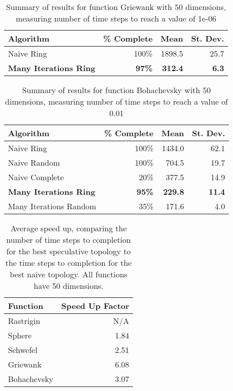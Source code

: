 \documentclass[smallcondensed]{svjour3}
\begin{document}
\begin{table}
  \caption{Summary of results for function Griewank with 50 dimensions,
  measuring number of time steps to reach a value of 1e-06}
  \label{tab:griewank-50}
  \centering
  \begin{tabular}{|l|r|r|r|}
  \hline
  Algorithm&\% Complete&Mean&St. Dev.\\
  \hline
  \hline
  Naive Ring&100\%&1898.5&25.7\\
  \hline
  \textbf{Many Iterations Ring}&\textbf{97\%}&\textbf{312.4}&\textbf{6.3}\\
  \hline
  \end{tabular}
\end{table}

\begin{table}
  \caption{Summary of results for function Bohachevsky with 50 dimensions,
  measuring number of time steps to reach a value of 0.01}
  \label{tab:bohachevsky-50}
  \centering
  \begin{tabular}{|l|r|r|r|}
  \hline
  Algorithm&\% Complete&Mean&St. Dev.\\
  \hline
  \hline
  Naive Ring&100\%&1434.0&62.1\\
  \hline
  Naive Random&100\%&704.5&19.7\\
  \hline
  Naive Complete&20\%&377.5&14.9\\
  \hline
  \textbf{Many Iterations Ring}&\textbf{95\%}&\textbf{229.8}&\textbf{11.4}\\
  \hline
  Many Iterations Random&35\%&171.6&4.0\\
  \hline
  \end{tabular}
\end{table}

\begin{table}
  \caption{Average speed up, comparing the number of time steps to completion
  for the best speculative topology to the time steps to completion for the
  best naive topology.  All functions have 50 dimensions.}
  \label{tab:50dims-summary}
  \centering
  \begin{tabular}{|l|r|}
	\hline
	Function&Speed Up Factor\\
	\hline
	Rastrigin&N/A\\
	\hline
	Sphere&1.84\\
	\hline
	Schwefel&2.51\\
	\hline
	Griewank&6.08\\
	\hline
	Bohachevsky&3.07\\
	\hline
  \end{tabular}
\end{table}
\end{document}
